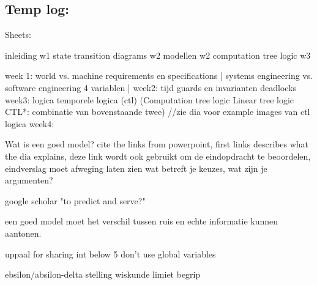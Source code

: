 \documentclass{article}
\begin{document}
\subsection{Temp log:}
Sheets:

inleiding w1
state transition diagrams w2
modellen w2
computation tree logic w3


week 1: 
world vs. machine
requirements en specifications |
systems engineering vs. software engineering
4 variablen |
week2:
tijd
guards en invarianten
deadlocks
week3:
logica
temporele logica (ctl)
(Computation tree logic
Linear tree logic
CTL*: combinatie van bovenstaande twee)
//zie dia voor example images van ctl logica
week4:




Wat is een goed model? cite the links from powerpoint, first links describes what the dia explains, deze link wordt ook gebruikt om de eindopdracht te beoordelen, eindverslag moet afweging laten zien wat betreft je keuzes, wat zijn je argumenten?

google scholar "to predict and serve?"

een goed model moet het verschil tussen ruis en echte informatie kunnen aantonen.

uppaal for sharing int below 5 don't use global variables

ebsilon/absilon-delta stelling wiskunde limiet begrip
\newpage


\end{document}
